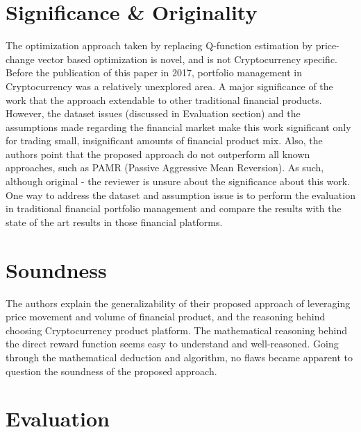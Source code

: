 \documentclass[twoside,11pt]{article}
\begin{document}
\section{Significance \& Originality}
The optimization approach taken by \cite{8324237} replacing Q-function estimation by price-change vector based optimization is novel, and is not Cryptocurrency specific. Before the publication of this paper in 2017, portfolio management in Cryptocurrency was a relatively unexplored area. A major significance of the work that the approach extendable to other traditional financial products. However, the dataset issues (discussed in Evaluation section) and the assumptions made regarding the financial market make this work significant only for trading small, insignificant amounts of financial product mix. Also, the authors point that the proposed approach do not outperform all known approaches, such as PAMR (Passive Aggressive Mean Reversion). As such, although original - the reviewer is unsure about the significance about this work. One way to address the dataset and assumption issue is to perform the evaluation in traditional financial portfolio management and compare the results with the state of the art results in those financial platforms.

\section{Soundness}

The authors explain the generalizability of their proposed approach of leveraging price movement and volume of financial product, and the reasoning behind choosing Cryptocurrency product platform. The mathematical reasoning behind the direct reward function seems easy to understand and well-reasoned. Going through the mathematical deduction and algorithm, no flaws became apparent to question the soundness of the proposed approach.

\section{Evaluation}
\end{document}
